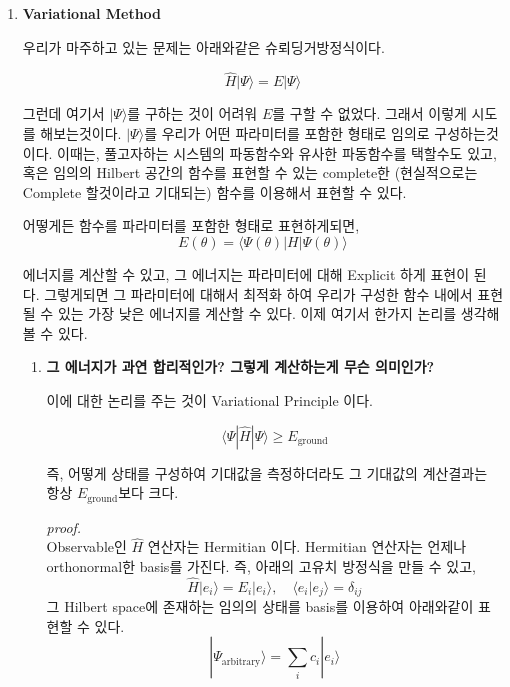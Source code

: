 \documentclass[11pt]{article}
\begin{document}
\begin{enumerate}[label=2)]
\item {\Large \textbf{Variational Method}}

우리가 마주하고 있는 문제는 아래와같은 슈뢰딩거방정식이다.

\[
\hat{H}|\Psi\rangle = E|\Psi\rangle
\]

그런데 여기서 $|\Psi\rangle$를 구하는 것이 어려워 $E$를 구할 수 없었다. 
그래서 이렇게 시도를 해보는것이다. $|\Psi\rangle$를 우리가 어떤 파라미터를 포함한 형태로 임의로 구성하는것이다. 
이때는, 풀고자하는 시스템의 파동함수와 유사한 파동함수를 택할수도 있고,
혹은 임의의 Hilbert 공간의 함수를 표현할 수 있는 complete한 (현실적으로는 Complete 할것이라고 기대되는) 함수를 이용해서 표현할 수 있다.

어떻게든 함수를 파라미터를 포함한 형태로 표현하게되면,
\[
E(\theta) = \langle \Psi(\theta) | H | \Psi(\theta) \rangle
\]

에너지를 계산할 수 있고, 그 에너지는 파라미터에 대해 Explicit 하게 표현이 된다. 
그렇게되면 그 파라미터에 대해서 최적화 하여 우리가 구성한 함수 내에서 표현될 수 있는 가장 낮은 에너지를 계산할 수 있다. 
이제 여기서 한가지 논리를 생각해볼 수 있다.

\begin{enumerate}[label=*]
\item  \textbf{그 에너지가 과연 합리적인가? 그렇게 계산하는게 무슨 의미인가?}

이에 대한 논리를 주는 것이 Variational Principle 이다.

\begin{tcolorbox}[enhanced, breakable, colback=gray!10, colframe=black, title=Definition: Variation Principle]

\[
\langle \Psi | \hat{H} | \Psi \rangle \geq E_{\text{ground}}
\]

즉, 어떻게 상태를 구성하여 기대값을 측정하더라도 그 기대값의 계산결과는 항상 $E_{\text{ground}}$보다 크다.

\end{tcolorbox}

\begin{mdframed}
\textit{proof.} \\
Observable인 $\hat{H}$ 연산자는 Hermitian 이다. Hermitian 연산자는 언제나 orthonormal한 basis를 가진다. 즉, 아래의 고유치 방정식을 만들 수 있고,
\[
\hat{H} |e_i \rangle = E_i |e_i \rangle, \quad \langle e_i | e_j \rangle = \delta_{ij}
\]
그 Hilbert space에 존재하는 임의의 상태를 basis를 이용하여 아래와같이 표현할 수 있다.
\[
|\Psi_{\text{arbitrary}}\rangle = \sum_i c_i |e_i\rangle \tag{1}
\]


\end{mdframed}
\end{enumerate}
\end{enumerate}
\end{document}

